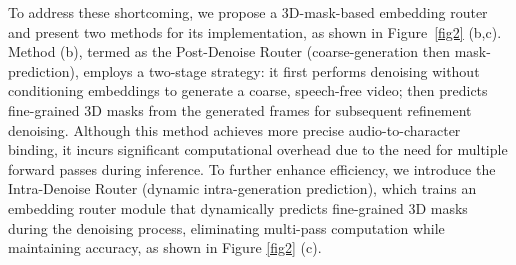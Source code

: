 To address these shortcoming, we propose a 3D-mask-based embedding router and present two methods for its implementation, as shown in Figure~\ref{fig2} (b,c).
Method (b), termed as the Post-Denoise Router (coarse-generation then mask-prediction), employs a two-stage strategy: it first performs denoising without conditioning embeddings to generate a coarse, speech-free video; then predicts fine-grained 3D masks from the generated frames for subsequent refinement denoising.
Although this method achieves more precise audio-to-character binding, it incurs significant computational overhead due to the need for multiple forward passes during inference.
To further enhance efficiency, we introduce the Intra-Denoise Router (dynamic intra-generation prediction), which trains an embedding router module that dynamically predicts fine-grained 3D masks during the denoising process, eliminating multi-pass computation while maintaining accuracy, as shown in Figure \ref{fig2} (c).
